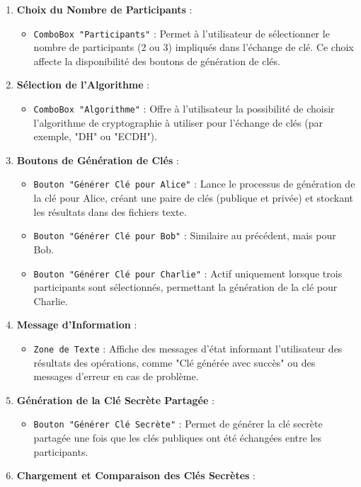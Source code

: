 \documentclass[a4paper,12pt]{report}
\begin{document}
\begin{enumerate}

	
	\item \textbf{Choix du Nombre de Participants} : 
	\begin{itemize}
		\item \texttt{ComboBox "Participants"} : Permet à l'utilisateur de sélectionner le nombre de participants (2 ou 3) impliqués dans l'échange de clé. Ce choix affecte la disponibilité des boutons de génération de clés.
	\end{itemize}
	
	\item \textbf{Sélection de l'Algorithme} : 
	\begin{itemize}
		\item \texttt{ComboBox "Algorithme"} : Offre à l'utilisateur la possibilité de choisir l'algorithme de cryptographie à utiliser pour l'échange de clés (par exemple, "DH" ou "ECDH").
	\end{itemize}
	
	\item \textbf{Boutons de Génération de Clés} : 
	\begin{itemize}
		\item \texttt{Bouton "Générer Clé pour Alice"} : Lance le processus de génération de la clé pour Alice, créant une paire de clés (publique et privée) et stockant les résultats dans des fichiers texte.
		\item \texttt{Bouton "Générer Clé pour Bob"} : Similaire au précédent, mais pour Bob.
		\item \texttt{Bouton "Générer Clé pour Charlie"} : Actif uniquement lorsque trois participants sont sélectionnés, permettant la génération de la clé pour Charlie.
	\end{itemize}
	
	\item \textbf{Message d'Information} : 
	\begin{itemize}
		\item \texttt{Zone de Texte} : Affiche des messages d'état informant l'utilisateur des résultats des opérations, comme "Clé générée avec succès" ou des messages d'erreur en cas de problème.
	\end{itemize}
	
	\item \textbf{Génération de la Clé Secrète Partagée} : 
	\begin{itemize}
		\item \texttt{Bouton "Générer Clé Secrète"} : Permet de générer la clé secrète partagée une fois que les clés publiques ont été échangées entre les participants.
	\end{itemize}
	
	\item \textbf{Chargement et Comparaison des Clés Secrètes} : 
	
\end{enumerate}
\end{document}
